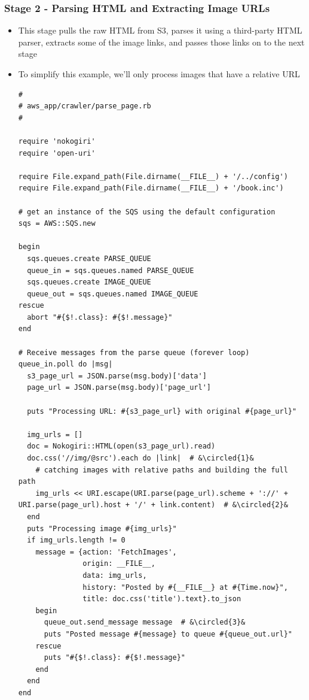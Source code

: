 \documentclass{beamer}
\newcommand*\circled[1]{\tikz[baseline=(char.base)]{
            \node[shape=circle,draw,inner sep=1pt] (char) {#1};}}
\begin{document}
\begin{frame}
\frametitle{Stage 2 - Parsing HTML and Extracting Image URLs}
\begin{itemize}
\item This stage pulls the raw HTML from
S3, parses it using a third-party HTML parser, extracts some of the image links, and
passes those links on to the next stage
\item To simplify this example, we’ll only process images that have a relative URL
\lstset{language=Ruby, style=eclipse}
\begin{lstlisting}
#
# aws_app/crawler/parse_page.rb
#

require 'nokogiri'
require 'open-uri'

require File.expand_path(File.dirname(__FILE__) + '/../config')
require File.expand_path(File.dirname(__FILE__) + '/book.inc')

# get an instance of the SQS using the default configuration
sqs = AWS::SQS.new

begin
  sqs.queues.create PARSE_QUEUE
  queue_in = sqs.queues.named PARSE_QUEUE
  sqs.queues.create IMAGE_QUEUE
  queue_out = sqs.queues.named IMAGE_QUEUE
rescue
  abort "#{$!.class}: #{$!.message}"
end

# Receive messages from the parse queue (forever loop)
queue_in.poll do |msg|
  s3_page_url = JSON.parse(msg.body)['data']
  page_url = JSON.parse(msg.body)['page_url']

  puts "Processing URL: #{s3_page_url} with original #{page_url}"

  img_urls = []
  doc = Nokogiri::HTML(open(s3_page_url).read)
  doc.css('//img/@src').each do |link|  # &\circled{1}&
    # catching images with relative paths and building the full path
    img_urls << URI.escape(URI.parse(page_url).scheme + '://' + URI.parse(page_url).host + '/' + link.content)  # &\circled{2}&
  end
  puts "Processing image #{img_urls}"
  if img_urls.length != 0
    message = {action: 'FetchImages',
               origin: __FILE__,
               data: img_urls,
               history: "Posted by #{__FILE__} at #{Time.now}",
               title: doc.css('title').text}.to_json
    begin
      queue_out.send_message message  # &\circled{3}&
      puts "Posted message #{message} to queue #{queue_out.url}"
    rescue
      puts "#{$!.class}: #{$!.message}"
    end
  end
end

\end{lstlisting}


\end{itemize}
\end{frame}
\end{document}
